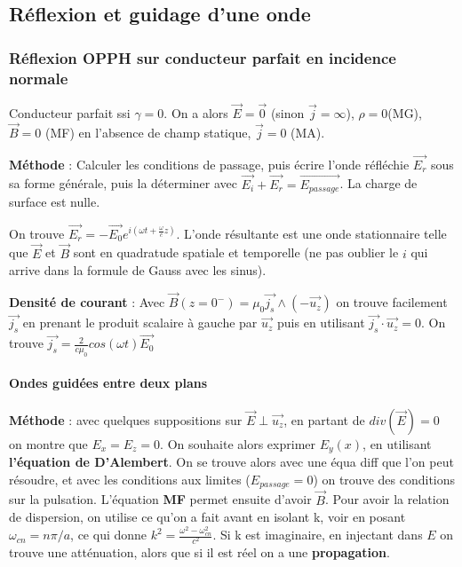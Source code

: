 \documentclass[9pt]{article}
\begin{document}
\begin{multicols*}{2}
\part*{Réflexion et guidage d'une onde}
\section{Réflexion OPPH sur conducteur parfait en incidence normale}
Conducteur parfait ssi $\gamma = 0$. On a alors $\overrightarrow{E}=\overrightarrow{0}$ (sinon $\overrightarrow{j}=\infty$), $\rho=0$(MG), $\overrightarrow{B}=0$ (MF) en l'absence de champ statique, $\overrightarrow{j}=0$ (MA).

\textbf{Méthode} : Calculer les conditions de passage, puis écrire l'onde réfléchie $\overrightarrow{E_r}$ sous sa forme générale, puis la déterminer avec $\overrightarrow{E_i}+\overrightarrow{E_r}=\overrightarrow{E_{passage}}$. La charge de surface est nulle.

On trouve $\overrightarrow{E_r}=-\overrightarrow{E_0}e^{i(\omega t + \frac{\omega}{c}z)}$. L'onde résultante est une onde stationnaire telle que $\overrightarrow{E}$ et $\overrightarrow{B}$ sont en quadratude spatiale et temporelle (ne pas oublier le $i$ qui arrive dans la formule de Gauss avec les sinus).

\textbf{Densité de courant} : Avec $\overrightarrow{B}(z=0^-) = \mu_0\overrightarrow{j_s}\wedge(-\overrightarrow{u_z})$ on trouve facilement $\overrightarrow{j_s}$ en prenant le produit scalaire à gauche par $\overrightarrow{u_z}$ puis en utilisant $\overrightarrow{j_s}\cdot\overrightarrow{u_z}=0$. On trouve $\overrightarrow{j_s}=\frac{2}{c\mu_0}cos(\omega t)\overrightarrow{E_0}$

\subsection{Ondes guidées entre deux plans}
\textbf{Méthode} : avec quelques suppositions sur $\overrightarrow{E}\perp\overrightarrow{u_z}$, en partant de $div(\overrightarrow{E})=0$ on montre que $E_x=E_z=0$. On souhaite alors exprimer $E_y(x)$, en utilisant \textbf{l'équation de D'Alembert}. On se trouve alors avec une équa diff que l'on peut résoudre, et avec les conditions aux limites ($E_{passage}=0$) on trouve des conditions sur la pulsation. L'équation \textbf{MF} permet ensuite d'avoir $\overrightarrow{B}$. Pour avoir la relation de dispersion, on utilise ce qu'on a fait avant en isolant k, voir en posant $\omega_{cn}=n\pi/a$, ce qui donne $\boxed{k^2=\frac{\omega^2-\omega_{cn}^2}{c^2}}$. Si k est imaginaire, en injectant dans $E$ on trouve une atténuation, alors que si il est réel on a une \textbf{propagation}.


\end{multicols*}
\end{document}
